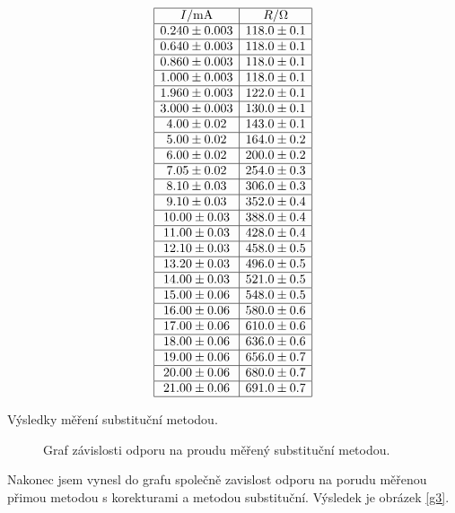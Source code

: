 \documentclass[a4paper,12pt]{article}
\begin{document}
\begin{table}
$$
\begin{array}{|c|c|}
\hline
I/\mbox{mA}&    R/\Omega \\ \hline
0.240\pm 0.003&118.0\pm 0.1\\ \hline
0.640\pm 0.003&118.0\pm 0.1\\ \hline
0.860\pm 0.003&118.0\pm 0.1\\ \hline
1.000\pm 0.003&118.0\pm 0.1\\ \hline
1.960\pm 0.003&122.0\pm 0.1\\ \hline
3.000\pm 0.003&130.0\pm 0.1\\ \hline
4.00\pm 0.02&143.0\pm 0.1\\ \hline
5.00\pm 0.02&164.0\pm 0.2\\ \hline
6.00\pm 0.02&200.0\pm 0.2\\ \hline
7.05\pm 0.02&254.0\pm 0.3\\ \hline
8.10\pm 0.03&306.0\pm 0.3\\ \hline
9.10\pm 0.03&352.0\pm 0.4\\ \hline
10.00\pm 0.03&388.0\pm 0.4\\ \hline
11.00\pm 0.03&428.0\pm 0.4\\ \hline
12.10\pm 0.03&458.0\pm 0.5\\ \hline
13.20\pm 0.03&496.0\pm 0.5\\ \hline
14.00\pm 0.03&521.0\pm 0.5\\ \hline
15.00\pm 0.06&548.0\pm 0.5\\ \hline
16.00\pm 0.06&580.0\pm 0.6\\ \hline
17.00\pm 0.06&610.0\pm 0.6\\ \hline
18.00\pm 0.06&636.0\pm 0.6\\ \hline
19.00\pm 0.06&656.0\pm 0.7\\ \hline
20.00\pm 0.06&680.0\pm 0.7\\ \hline
21.00\pm 0.06&691.0\pm 0.7\\ \hline
\end{array}
$$
\caption{Výsledky měření substituční metodou.}
\label{TUk3}
\end{table}

\begin{figure}

\caption{Graf závislosti odporu na proudu měřený substituční metodou.}
\label{g2}
\end{figure}

Nakonec jsem vynesl do grafu společně zavislost odporu na porudu měřenou přimou metodou s korekturami a metodou substituční. Výsledek je obrázek \ref{g3}.
\end{document}
